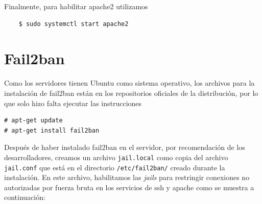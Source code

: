 \documentclass[9pt]{article}
\begin{document}
Finalmente, para habilitar \textsf{apache2} utilizamos
\begin{verbatim}
    $ sudo systemctl start apache2
\end{verbatim}

\newpage

\section{Fail2ban}
Como los servidores tienen \textsf{Ubuntu} como sistema operativo, los archivos para la instalación de \textsf{fail2ban} están en los repositorios oficiales de la distribución, por lo que solo hizo falta ejecutar las instrucciones
\begin{verbatim}
# apt-get update
# apt-get install fail2ban
\end{verbatim}
Después de haber instalado \textsf{fail2ban} en el servidor, por recomendación de los desarrolladores, creamos un archivo \texttt{jail.local} como copia del archivo \texttt{jail.conf} que está en el directorio \texttt{/etc/fail2ban/} creado durante la instalación. En este archivo, habilitamos las \textit{jails} para restringir conexiones no autorizadas por fuerza bruta en los servicios de \textsf{ssh} y \textsf{apache} como se muestra a continuación:
\end{document}
